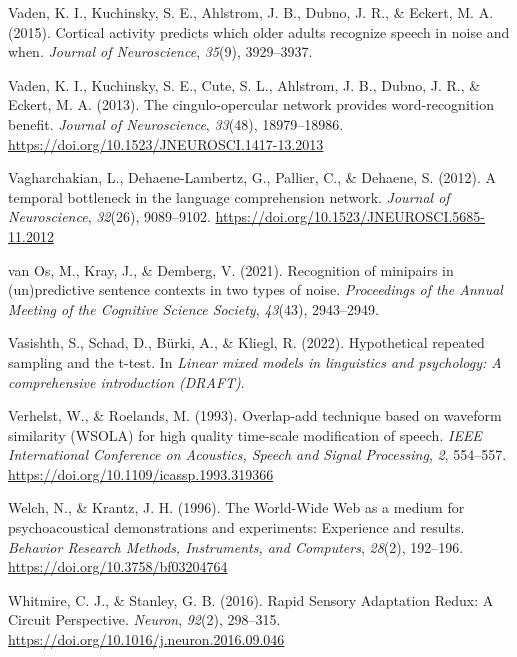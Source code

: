 \documentclass[a4paper, nobind]{templates/ociamthesis}
\newlength{\cslhangindent}
\newenvironment{CSLReferences}[2] %
 {%
  \setlength{\parindent}{0pt}
  \ifodd #1
  \let\oldpar\par
  \def\par{\hangindent=\cslhangindent\oldpar}
  \fi
  \setlength{\parskip}{1mm}
  \setlength{\baselineskip}{6mm}
 }%
 {}
\begin{document}
\begin{CSLReferences}{1}{0}
\leavevmode{}%
Vaden, K. I., Kuchinsky, S. E., Ahlstrom, J. B., Dubno, J. R., \& Eckert, M. A. (2015). Cortical activity predicts which older adults recognize speech in noise and when. \emph{Journal of Neuroscience}, \emph{35}(9), 3929--3937.

\leavevmode{}%
Vaden, K. I., Kuchinsky, S. E., Cute, S. L., Ahlstrom, J. B., Dubno, J. R., \& Eckert, M. A. (2013). {The cingulo-opercular network provides word-recognition benefit}. \emph{Journal of Neuroscience}, \emph{33}(48), 18979--18986. \url{https://doi.org/10.1523/JNEUROSCI.1417-13.2013}

\leavevmode{}%
Vagharchakian, L., Dehaene-Lambertz, G., Pallier, C., \& Dehaene, S. (2012). {A temporal bottleneck in the language comprehension network}. \emph{Journal of Neuroscience}, \emph{32}(26), 9089--9102. \url{https://doi.org/10.1523/JNEUROSCI.5685-11.2012}

\leavevmode{}%
van Os, M., Kray, J., \& Demberg, V. (2021). {Recognition of minipairs in (un)predictive sentence contexts in two types of noise}. \emph{Proceedings of the Annual Meeting of the Cognitive Science Society}, \emph{43}(43), 2943--2949.

\leavevmode{}%
Vasishth, S., Schad, D., Bürki, A., \& Kliegl, R. (2022). Hypothetical repeated sampling and the t-test. In \emph{Linear mixed models in linguistics and psychology: A comprehensive introduction (DRAFT)}.

\leavevmode{}%
Verhelst, W., \& Roelands, M. (1993). {Overlap-add technique based on waveform similarity (WSOLA) for high quality time-scale modification of speech}. \emph{IEEE International Conference on Acoustics, Speech and Signal Processing}, \emph{2}, 554--557. \url{https://doi.org/10.1109/icassp.1993.319366}

\leavevmode{}%
Welch, N., \& Krantz, J. H. (1996). {The World-Wide Web as a medium for psychoacoustical demonstrations and experiments: Experience and results}. \emph{Behavior Research Methods, Instruments, and Computers}, \emph{28}(2), 192--196. \url{https://doi.org/10.3758/bf03204764}

\leavevmode{}%
Whitmire, C. J., \& Stanley, G. B. (2016). {Rapid Sensory Adaptation Redux: A Circuit Perspective}. \emph{Neuron}, \emph{92}(2), 298--315. \url{https://doi.org/10.1016/j.neuron.2016.09.046}


\end{CSLReferences}
\end{document}
